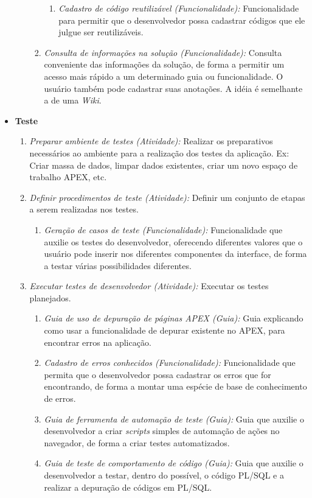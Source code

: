 \begin{itemize}
\begin{itemize}
\begin{enumerate}
\begin{enumerate}
\item \textit{Cadastro de código reutilizável (Funcionalidade):} Funcionalidade para permitir que o desenvolvedor possa cadastrar códigos que ele julgue ser reutilizáveis.
\end{enumerate}
\item \textit{Consulta de informações na solução (Funcionalidade):} Consulta conveniente das informações da solução, de forma a permitir um acesso mais rápido a um determinado guia ou funcionalidade. O usuário também pode cadastrar suas anotações. A idéia é semelhante a de uma \textit{Wiki}.
\end{enumerate}
\end{itemize}
\item \textbf{Teste}
\begin{enumerate}
\item \textit{Preparar ambiente de testes (Atividade):} Realizar os preparativos necessários ao ambiente para a realização dos testes da aplicação. Ex: Criar massa de dados, limpar dados existentes, criar um novo espaço de trabalho APEX, etc.
\item \textit{Definir procedimentos de teste (Atividade):} Definir um conjunto de etapas a serem realizadas nos testes.
\begin{enumerate}
\item \textit{Geração de casos de teste (Funcionalidade):} Funcionalidade que auxilie os testes do desenvolvedor, oferecendo diferentes valores que o usuário pode inserir nos diferentes componentes da interface, de forma a testar várias possibilidades diferentes.
\end{enumerate}
\item \textit{Executar testes de desenvolvedor (Atividade):} Executar os testes planejados.
\begin{enumerate}
\item \textit{Guia de uso de depuração de páginas APEX (Guia):} Guia explicando como usar a funcionalidade de depurar existente no APEX, para encontrar erros na aplicação.
\item \textit{Cadastro de erros conhecidos (Funcionalidade):} Funcionalidade que permita que o desenvolvedor possa cadastrar os erros que for encontrando, de forma a montar uma espécie de base de conhecimento de erros.
\item \textit{Guia de ferramenta de automação de teste (Guia):} Guia que auxilie o desenvolvedor a criar \textit{scripts} simples de automação de ações no navegador, de forma a criar testes automatizados.
\item \textit{Guia de teste de comportamento de código (Guia):} Guia que auxilie o desenvolvedor a testar, dentro do possível, o código PL/SQL e a realizar a depuração de códigos em PL/SQL.

\end{enumerate}
\end{enumerate}
\end{itemize}
